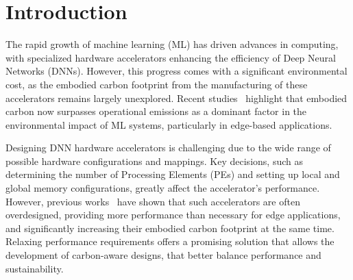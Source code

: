 
\vspace{-5pt}
\section{Introduction}\label{sec:introduction}
\vspace{-3pt}
The rapid growth of machine learning (ML) has driven advances in computing, with specialized hardware accelerators enhancing the efficiency of Deep Neural Networks (DNNs). However, this progress comes with a significant environmental cost, as the embodied carbon footprint from the manufacturing of these accelerators remains largely unexplored. Recent studies~\cite{gupta2021chasing,panteleaki2024carbon} highlight that embodied carbon now surpasses operational emissions as a dominant factor in the environmental impact of ML systems, particularly in edge-based applications.

Designing DNN hardware accelerators is challenging due to the wide range of possible hardware configurations and mappings. Key decisions, such as determining the number of Processing Elements (PEs) and setting up local and global memory configurations, greatly affect the accelerator's performance. However, previous works~\cite{gupta2022act} have shown that such accelerators are often overdesigned, providing more performance than necessary for edge applications, and significantly increasing their embodied carbon footprint at the same time. Relaxing performance requirements offers a promising solution that allows the development of carbon-aware designs, that better balance performance and sustainability.


